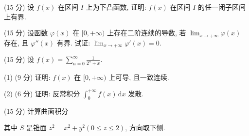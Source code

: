 \par{}
(15 分) 设 $f(x)$ 在区间 $I$ 上为下凸函数, 证明: $f(x)$ 在区间 $I$ 的任一闭子区间上有界.\par
\par{}
(15 分) 设函数 $\varphi(x)$ 在 $[0, +\infty)$ 上存在二阶连续的导数, 若 $\lim_{x \to +\infty} \varphi(x)$ 存在, 且 $\varphi''(x)$ 有界. 试证: $\lim_{x \to +\infty} \varphi'(x) = 0$.\par
\par{}
(15 分) 设 $f(x) = \sum_{n=0}^{\infty} \frac{1}{2^n + x}$.\par
(1) (9 分) 证明: $f(x)$ 在 $[0, +\infty)$ 上可导, 且一致连续.\par
(2) (6 分) 证明: 反常积分 $\int_{0}^{+\infty} f(x) \, \mathrm{d}x$ 发散.\par
\par{}
\par{}
(15 分) 计算曲面积分\par
\nopagebreak[4]
其中 $S$ 是锥面 $z^2 = x^2 + y^2 (0 \leq z \leq 2)$, 方向取下侧.\par
